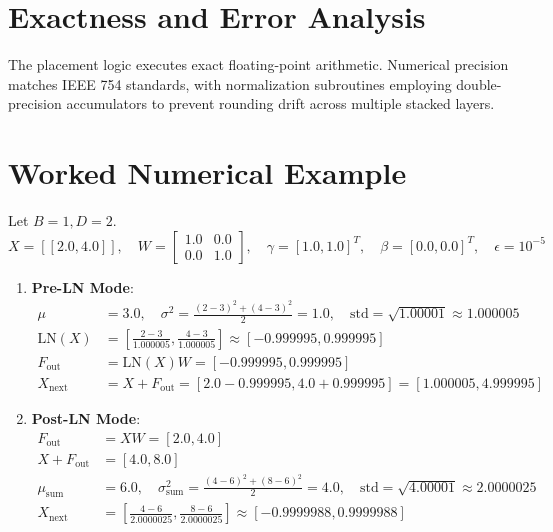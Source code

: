 \documentclass[11pt,a4paper]{article}
\theoremstyle{definition}
\begin{document}
\section{Exactness and Error Analysis}

The placement logic executes exact floating-point arithmetic. Numerical precision matches IEEE 754 standards, with normalization subroutines employing double-precision accumulators to prevent rounding drift across multiple stacked layers.

\section{Worked Numerical Example}

Let $B = 1, D = 2$.
\begin{equation}
X = [[2.0, 4.0]], \quad W = \begin{bmatrix} 1.0 & 0.0 \\ 0.0 & 1.0 \end{bmatrix}, \quad \gamma = [1.0, 1.0]^T, \quad \beta = [0.0, 0.0]^T, \quad \epsilon = 10^{-5}
\end{equation}

\begin{enumerate}
    \item \textbf{Pre-LN Mode}:
    \begin{align}
    \mu &= 3.0, \quad \sigma^2 = \frac{(2-3)^2 + (4-3)^2}{2} = 1.0, \quad \text{std} = \sqrt{1.00001} \approx 1.000005 \\
    \text{LN}(X) &= \left[ \frac{2-3}{1.000005}, \frac{4-3}{1.000005} \right] \approx [-0.999995, 0.999995] \\
    F_{\text{out}} &= \text{LN}(X) W = [-0.999995, 0.999995] \\
    X_{\text{next}} &= X + F_{\text{out}} = [2.0 - 0.999995, 4.0 + 0.999995] = [1.000005, 4.999995]
    \end{align}
    \item \textbf{Post-LN Mode}:
    \begin{align}
    F_{\text{out}} &= X W = [2.0, 4.0] \\
    X + F_{\text{out}} &= [4.0, 8.0] \\
    \mu_{\text{sum}} &= 6.0, \quad \sigma_{\text{sum}}^2 = \frac{(4-6)^2 + (8-6)^2}{2} = 4.0, \quad \text{std} = \sqrt{4.00001} \approx 2.0000025 \\
    X_{\text{next}} &= \left[ \frac{4-6}{2.0000025}, \frac{8-6}{2.0000025} \right] \approx [-0.9999988, 0.9999988]
    \end{align}
\end{enumerate}
\end{document}
